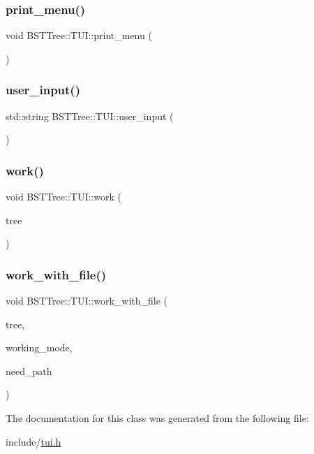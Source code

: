 \subsubsection{\texorpdfstring{print\+\_\+menu()}{print\_menu()}}
{\footnotesize\ttfamily void B\+S\+T\+Tree\+::\+T\+U\+I\+::print\+\_\+menu (\begin{DoxyParamCaption}{ }\end{DoxyParamCaption})}

\mbox{\label{class_b_s_t_tree_1_1_t_u_i_a3527b06df46672627360a856068cc208}} 
\subsubsection{\texorpdfstring{user\+\_\+input()}{user\_input()}}
{\footnotesize\ttfamily std\+::string B\+S\+T\+Tree\+::\+T\+U\+I\+::user\+\_\+input (\begin{DoxyParamCaption}{ }\end{DoxyParamCaption})}

\mbox{\label{class_b_s_t_tree_1_1_t_u_i_afe4974e135f19675c0d7a399569d0260}} 
\subsubsection{\texorpdfstring{work()}{work()}}
{\footnotesize\ttfamily void B\+S\+T\+Tree\+::\+T\+U\+I\+::work (\begin{DoxyParamCaption}\item[{\mbox{\hyperlink{class_b_s_t_tree_1_1_tree}{B\+S\+T\+Tree\+::\+Tree}} \&}]{tree }\end{DoxyParamCaption})}

\mbox{\label{class_b_s_t_tree_1_1_t_u_i_a8fd19902f1902a50ffd94493f4f3b538}} 
\subsubsection{\texorpdfstring{work\+\_\+with\+\_\+file()}{work\_with\_file()}}
{\footnotesize\ttfamily void B\+S\+T\+Tree\+::\+T\+U\+I\+::work\+\_\+with\+\_\+file (\begin{DoxyParamCaption}\item[{\mbox{\hyperlink{class_b_s_t_tree_1_1_tree}{B\+S\+T\+Tree\+::\+Tree}} \&}]{tree,  }\item[{int}]{working\+\_\+mode,  }\item[{bool}]{need\+\_\+path }\end{DoxyParamCaption})}



The documentation for this class was generated from the following file\+:\begin{DoxyCompactItemize}
\item 
include/\mbox{\hyperlink{tui_8h}{tui.\+h}}\end{DoxyCompactItemize}
